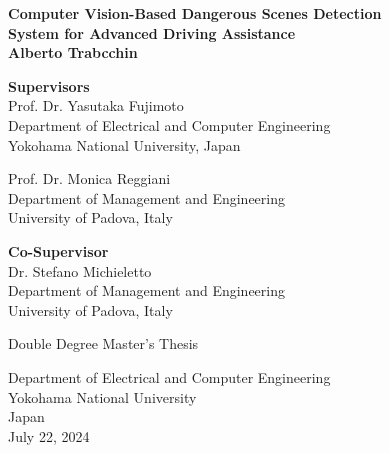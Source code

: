 \begin{titlepage}
\begin{center}

\vspace*{0.5cm}
\textbf{\Large{Computer Vision-Based Dangerous Scenes Detection}\\ 
        \vspace*{0.2cm}
        \Large{System for Advanced Driving Assistance}}\\
\vspace*{2cm}
\textbf{\large{Alberto Trabcchin}}\\
\vfill

\vspace*{1cm}

\begin{flushright}
\textbf{Supervisors} \\
\vspace*{0.5cm}
Prof. Dr. Yasutaka Fujimoto \\
Department of Electrical and Computer Engineering \\
Yokohama National University, Japan

\vspace*{0.5cm}

Prof. Dr. Monica Reggiani \\
Department of Management and Engineering \\
University of Padova, Italy

\vspace*{1cm}

\textbf{Co-Supervisor} \\
\vspace*{0.5cm}
Dr. Stefano Michieletto \\
Department of Management and Engineering \\
University of Padova, Italy
\end{flushright}

\vfill

Double Degree Master's Thesis\\
    
\vspace{0.8cm}

    
Department of Electrical and Computer Engineering\\
Yokohama National University\\
Japan\\
July 22, 2024
            
\end{center}
\end{titlepage}

\afterpage{\blankpage}
